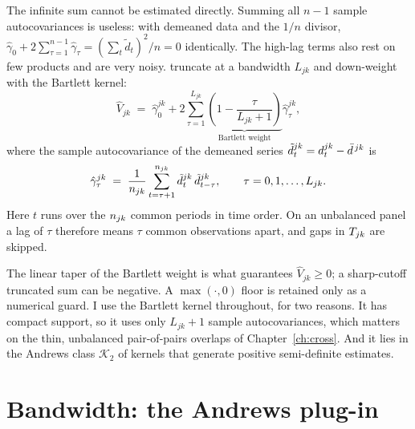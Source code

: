 The infinite sum cannot be estimated directly. Summing all $n-1$ sample autocovariances
is useless: with demeaned data and the $1/n$ divisor, $\hat\gamma_0 +
2\sum_{\tau=1}^{n-1}\hat\gamma_\tau = (\sum_t\tilde d_t)^2/n = 0$ identically. The
high-lag terms also rest on few products and are very noisy. \citet{neweywest1987}
truncate at a bandwidth $L_{jk}$ and down-weight with the Bartlett kernel:
\begin{equation}
  \hat{V}_{jk}
  \;=\; \hat{\gamma}^{jk}_0
  + 2\sum_{\tau=1}^{L_{jk}}
  \underbrace{\left(1 - \frac{\tau}{L_{jk}+1}\right)}_{\text{Bartlett weight}}
  \hat{\gamma}^{jk}_\tau ,
  \label{eq:nw}
\end{equation}
where the sample autocovariance of the demeaned series
$\tilde{d}^{jk}_t = d^{jk}_t - \bar{d}^{\,jk}$ is
\begin{equation}
  \hat{\gamma}^{jk}_\tau
  \;=\; \frac{1}{n_{jk}}\sum_{t=\tau+1}^{n_{jk}}
  \tilde{d}^{jk}_t\,\tilde{d}^{jk}_{t-\tau},
  \qquad \tau = 0,1,\dots,L_{jk}.
\end{equation}
Here $t$ runs over the $n_{jk}$ common periods in time order. On an unbalanced panel a
lag of $\tau$ therefore means $\tau$ common observations apart, and gaps in $T_{jk}$ are
skipped.

The linear taper of the Bartlett weight is what guarantees $\hat{V}_{jk}\ge 0$; a
sharp-cutoff truncated sum can be negative. A $\max(\cdot,0)$ floor is retained only as
a numerical guard. I use the Bartlett kernel throughout, for two reasons. It has compact
support, so it uses only $L_{jk}+1$ sample autocovariances, which matters on the thin,
unbalanced pair-of-pairs overlaps of Chapter~\ref{ch:cross}. And it lies in the Andrews
class $\mathcal{K}_2$ of kernels that generate positive semi-definite estimates.

\section{Bandwidth: the Andrews plug-in}
\label{sec:bandwidth}

